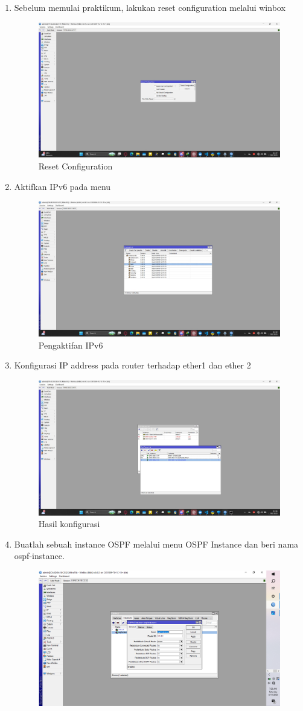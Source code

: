 \begin{enumerate}
  
  \item Sebelum memulai praktikum, lakukan reset configuration melalui winbox
   \begin{figure}[H]
    \centering
    \includegraphics[width=0.5\linewidth]{P1/img/7.jpeg}
    \caption{Reset Configuration}
    \label{fig:inirujukan}
  \end{figure}
  \item Aktifkan IPv6 pada menu
   \begin{figure}[H]
    \centering
    \includegraphics[width=0.5\linewidth]{P1/img/8.jpeg}
    \caption{Pengaktifan IPv6}
    \label{fig:inirujukan}
  \end{figure}
  \item Konfigurasi IP address pada router terhadap ether1 dan ether 2
   \begin{figure}[H]
    \centering
    \includegraphics[width=0.5\linewidth]{P1/img/9.jpeg}
    \caption{Hasil konfigurasi}
    \label{fig:inirujukan}
  \end{figure}
\item Buatlah sebuah instance OSPF melalui menu OSPF Instance dan beri nama ospf-instance.
    \begin{figure}[H]
        \centering
        \includegraphics[width=0.5\linewidth]{P1/gambar5.png}

\end{figure}
\end{enumerate}
